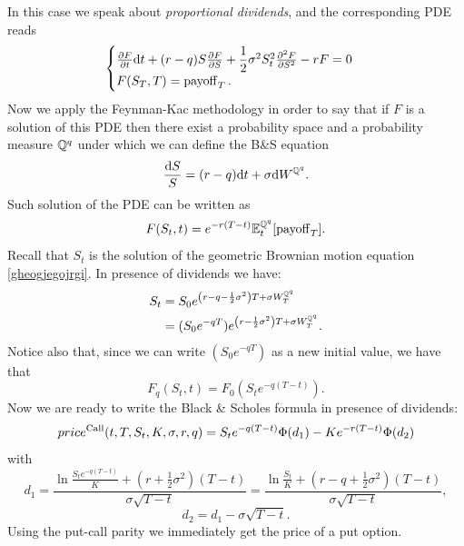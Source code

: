 In this case we speak about \emph{proportional dividends}, and the corresponding PDE reads
\begin{equation}
    \begin{cases}
    \pdv{F}{t}\dd t + (r-q)S\pdv{F}{S} + \dfrac{1}{2}\sigma^2S_t^2\pdv[2]{F}{S} - rF = 0 \\
    F(S_T,T) = \operatorname{payoff}_T.
    \end{cases}
\end{equation}
Now we apply the Feynman-Kac methodology in order to say that if $F$ is a solution of this PDE then there exist a probability space and a probability measure $\mathbb{Q}^q$ under which we can define the B\&S equation
\begin{equation}\label{gheogjegojrgi}
    \dfrac{\dd S}{S} = (r-q)\dd t + \sigma \dd W^{\mathbb{Q}^q}.
\end{equation}
Such solution of the PDE can be written as
\begin{equation}
    F(S_t,t) = e^{-r(T-t)}\mathbb{E}^{\mathbb{Q}^q}_t[\operatorname{payoff}_T].
\end{equation}
Recall that $S_t$ is the solution of the geometric Brownian motion equation \eqref{gheogjegojrgi}. In presence of dividends we have:
\begin{align}
    S_t &= S_0e^{\left(r-q-\frac{1}{2}\sigma^2\right)T+\sigma W_T^{\mathbb{Q}^q}} \\
    &=
    (S_0e^{-qT})e^{\left(r-\frac{1}{2}\sigma^2\right)T+\sigma W_T^{\mathbb{Q}^q}}.
\end{align}
Notice also that, since we can write $(S_0e^{-qT})$ as a new initial value, we have that
\begin{equation}
    F_q(S_t,t) = F_0(S_te^{-q( T-t)}).
\end{equation}
Now we are ready to write the Black \& Scholes formula in presence of dividends:
\begin{equation}
    price^{\operatorname{Call}}(t,T,S_t,K,\sigma,r,q) = S_te^{-q( T-t)}\Phi(d_1)-Ke^{-r(T-t)}\Phi(d_2)
\end{equation}
with
\begin{equation}
    d_1 = \dfrac{\ln\frac{S_te^{-q(T-t)}}{K}+\left(r+\frac{1}{2}\sigma^2\right)(T-t)}{\sigma\sqrt{T-t}} = \dfrac{\ln\frac{S_t}{K}+\left(r-q+\frac{1}{2}\sigma^2\right)(T-t)}{\sigma\sqrt{T-t}},
\end{equation}
\begin{equation}
    d_2 = d_1 - \sigma\sqrt{T-t}.
\end{equation}
Using the put-call parity we immediately get the price of a put option.

